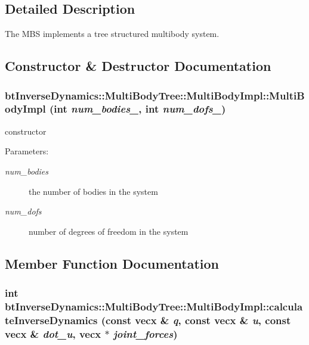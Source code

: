 \subsection{Detailed Description}
The MBS implements a tree structured multibody system. 

\subsection{Constructor \& Destructor Documentation}
\hypertarget{classbt_inverse_dynamics_1_1_multi_body_tree_1_1_multi_body_impl_1451e035a52b67c1804d7dd0dd799af2}{
\subsubsection[MultiBodyImpl]{\setlength{\rightskip}{0pt plus 5cm}btInverseDynamics::MultiBodyTree::MultiBodyImpl::MultiBodyImpl (int {\em num\_\-bodies\_\-}, \/  int {\em num\_\-dofs\_\-})}}
\label{classbt_inverse_dynamics_1_1_multi_body_tree_1_1_multi_body_impl_1451e035a52b67c1804d7dd0dd799af2}


constructor \begin{Desc}
\item[Parameters:]
\begin{description}
\item[{\em num\_\-bodies}]the number of bodies in the system \item[{\em num\_\-dofs}]number of degrees of freedom in the system \end{description}
\end{Desc}


\subsection{Member Function Documentation}
\hypertarget{classbt_inverse_dynamics_1_1_multi_body_tree_1_1_multi_body_impl_408ca0c5fe8fcd75b2b8672e96c2237a}{
\subsubsection[calculateInverseDynamics]{\setlength{\rightskip}{0pt plus 5cm}int btInverseDynamics::MultiBodyTree::MultiBodyImpl::calculateInverseDynamics (const vecx \& {\em q}, \/  const vecx \& {\em u}, \/  const vecx \& {\em dot\_\-u}, \/  vecx $\ast$ {\em joint\_\-forces})}}
\label{classbt_inverse_dynamics_1_1_multi_body_tree_1_1_multi_body_impl_408ca0c5fe8fcd75b2b8672e96c2237a}


